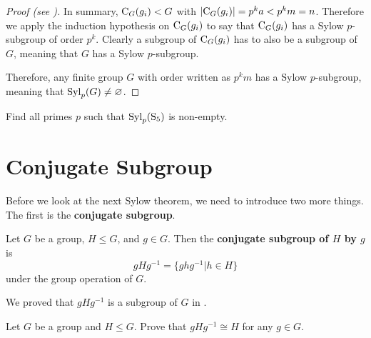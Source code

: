 \begin{proof}[Proof (see {\cite[pp.~1--3]{mann_2011}})]
    In summary, $\mathrm{C}_{G}(g_i) < G$ with $|\mathrm{C}_{G}(g_i)| = p^ka < p^km = n$. Therefore we apply the induction hypothesis on $\mathrm{C}_{G}(g_i)$ to say that $\mathrm{C}_{G}(g_i)$ has a Sylow $p$-subgroup of order $p^k$. Clearly a subgroup of $\mathrm{C}_{G}(g_i)$ has to also be a subgroup of $G$, meaning that $G$ has a Sylow $p$-subgroup.

    Therefore, any finite group $G$ with order written as $p^k m$ has a Sylow $p$-subgroup, meaning that $\mathrm{Syl}_{p}(G) \neq \varnothing$.
\end{proof}

\begin{exercise}
    Find all primes $p$ such that $\mathrm{Syl}_{p}(\mathrm{S}_{5})$ is non-empty.
\end{exercise}

\section{Conjugate Subgroup}
Before we look at the next Sylow theorem, we need to introduce two more things. The first is the \textbf{conjugate subgroup}.
\begin{definition}
    Let $G$ be a group, $H \leq G$, and $g \in G$. Then the \textbf{conjugate subgroup of $H$ by $g$} is
    \[
        gHg^{-1} = \{ghg^{-1} \vert h \in H\}
    \]
    under the group operation of $G$.
\end{definition}
We proved that $gHg^{-1}$ is a subgroup of $G$ in .

\begin{exercise}\label{exercise-conjugate-subgroup-isomorphic-to-subgroup}
    Let $G$ be a group and $H \leq G$. Prove that $gHg^{-1} \cong H$ for any $g \in G$.
\end{exercise}

